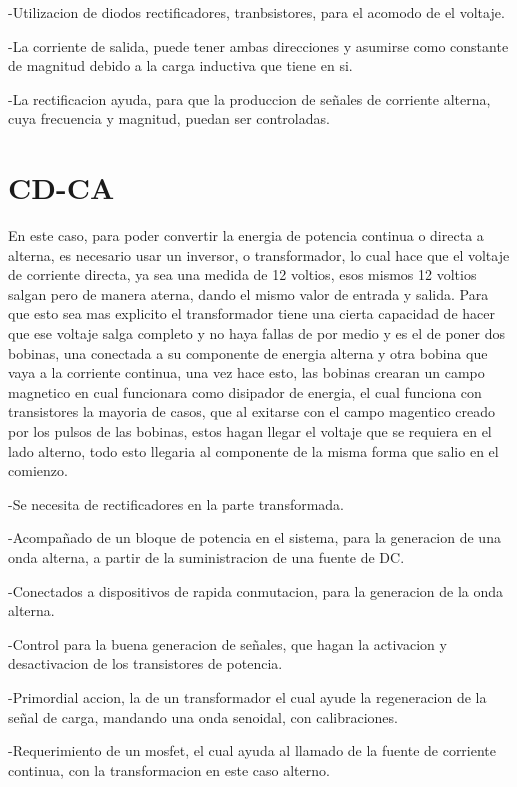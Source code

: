 \documentclass[12pt]{article}
\begin{document}
-Utilizacion de diodos rectificadores, tranbsistores, para el acomodo de el voltaje.

-La corriente de salida, puede tener ambas direcciones y asumirse como constante de magnitud debido a la carga inductiva que tiene en si.

-La rectificacion ayuda, para que la produccion de señales de corriente alterna, cuya frecuencia y magnitud, puedan ser controladas.


\section{CD-CA}
En este caso, para poder convertir la energia de potencia continua o directa a alterna, es necesario usar un inversor, o transformador, lo cual hace que el voltaje de corriente directa, ya sea una medida de 12 voltios, esos mismos 12 voltios salgan pero de manera aterna, dando el mismo valor de entrada y salida. Para que esto sea mas explicito el transformador tiene una cierta capacidad de hacer que ese voltaje salga completo y no haya fallas de por medio y es el de poner dos bobinas, una conectada a su componente de energia alterna y otra bobina que vaya a la corriente continua, una vez hace esto, las bobinas crearan un campo magnetico en cual funcionara como disipador de energia, el cual funciona con transistores la mayoria de casos, que al exitarse con el campo magentico creado por los pulsos de las bobinas, estos hagan llegar el voltaje que se requiera en el lado alterno,  todo esto llegaria al componente de la misma forma que salio en el comienzo.

 -Se necesita de rectificadores en la parte transformada.
 
 -Acompañado de un bloque de potencia en el sistema, para la generacion de una onda alterna, a partir de la suministracion de una fuente de DC.
 
 -Conectados a dispositivos de rapida conmutacion, para la generacion de la onda alterna.
 
 -Control para la buena generacion de señales, que hagan la activacion y desactivacion de los transistores de potencia.
 
 -Primordial accion, la de un transformador el cual ayude la regeneracion de la señal de carga, mandando una onda senoidal, con calibraciones.
 
 -Requerimiento de un mosfet, el cual ayuda al llamado de la fuente de corriente continua, con la transformacion en este caso alterno. 
 
\end{document}
